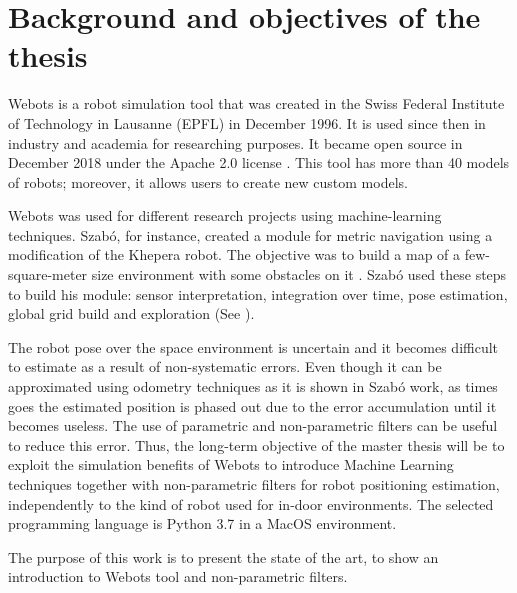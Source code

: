 \section{Background and objectives of the thesis}

Webots is a robot simulation tool that was created in the Swiss Federal Institute of Technology in Lausanne (EPFL) in December 1996. It is used since then in industry and academia for researching purposes. It became open source in December 2018 under the Apache 2.0 license \cite{cyberbotics}.  This tool has more than 40 models of robots; moreover, it allows users to create new custom models.


Webots was used for different research projects using machine-learning techniques. Szab\'{o}, for instance, created a module for metric navigation using a modification of the Khepera robot. The objective was to build a map of a few-square-meter size environment with some obstacles on it \cite{szabo}. Szab\'{o} used these steps to build his module: sensor interpretation, integration over time, pose estimation, global grid build and exploration (See \cite{thrun-1}).

The robot pose over the space environment is uncertain and it becomes difficult to estimate as a result of non-systematic errors. Even though it can be approximated using odometry techniques as it is shown in Szab\'{o} work, as times goes the estimated position is phased out due to the error accumulation until it becomes useless. The use of parametric and non-parametric filters can be useful to reduce this error. Thus, the long-term objective of the master thesis will be to exploit the simulation benefits of Webots to introduce Machine Learning techniques together with non-parametric filters for robot positioning estimation, independently to the kind of robot used for in-door environments. The selected programming language is Python 3.7 in a MacOS environment.

The purpose of this work is to present the state of the art, to show an introduction to Webots tool and non-parametric filters. 
